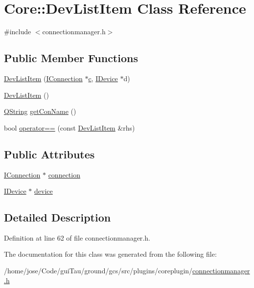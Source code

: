 \hypertarget{class_core_1_1_dev_list_item}{\section{Core\-:\-:Dev\-List\-Item Class Reference}
\label{class_core_1_1_dev_list_item}
}


{\ttfamily \#include $<$connectionmanager.\-h$>$}

\subsection*{Public Member Functions}
\begin{DoxyCompactItemize}
\item 
\hyperlink{group___core_plugin_ga199678fb9a10fcfef1c6fa7b989d65eb}{Dev\-List\-Item} (\hyperlink{class_core_1_1_i_connection}{I\-Connection} $\ast$\hyperlink{glext_8h_a1f2d7f8147412c43ba2303a56f97ee73}{c}, \hyperlink{class_core_1_1_i_device}{I\-Device} $\ast$d)
\item 
\hyperlink{group___core_plugin_ga2fcb8c98fc900f791ff84bd456d87ff0}{Dev\-List\-Item} ()
\item 
\hyperlink{group___u_a_v_objects_plugin_gab9d252f49c333c94a72f97ce3105a32d}{Q\-String} \hyperlink{group___core_plugin_gaf7dec4fe2f034b9aa427ebd65a654223}{get\-Con\-Name} ()
\item 
bool \hyperlink{group___core_plugin_ga4f9413618925cdef3d54aa67f2bf460b}{operator==} (const \hyperlink{class_core_1_1_dev_list_item}{Dev\-List\-Item} \&rhs)
\end{DoxyCompactItemize}
\subsection*{Public Attributes}
\begin{DoxyCompactItemize}
\item 
\hyperlink{class_core_1_1_i_connection}{I\-Connection} $\ast$ \hyperlink{group___core_plugin_ga90db60736480bb690e6ec029acbce4d1}{connection}
\item 
\hyperlink{class_core_1_1_i_device}{I\-Device} $\ast$ \hyperlink{group___core_plugin_gaeccb7d8e859208ce0b37c4589b3b4c88}{device}
\end{DoxyCompactItemize}


\subsection{Detailed Description}


Definition at line 62 of file connectionmanager.\-h.



The documentation for this class was generated from the following file\-:\begin{DoxyCompactItemize}
\item 
/home/jose/\-Code/gui\-Tau/ground/gcs/src/plugins/coreplugin/\hyperlink{connectionmanager_8h}{connectionmanager.\-h}\end{DoxyCompactItemize}
